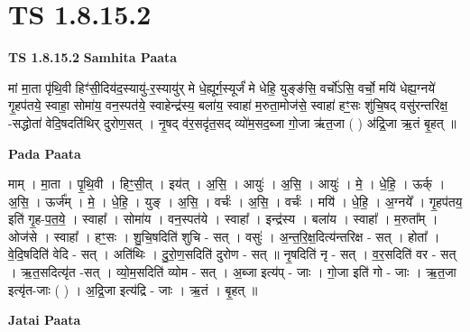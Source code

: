 \documentclass[17pt]{extarticle}
\begin{document}
\section{ TS 1.8.15.2 }

\textbf{TS 1.8.15.2 } \newline
\textbf{Samhita Paata} \newline

मां मा॒ता पृ॑थि॒वी हिꣳ॑सी॒दिय॑द॒स्यायु॑-र॒स्यायु॑र् मे धे॒ह्यूर्ग॒स्यूर्जं॑ मे धेहि॒ युङ्ङ॑सि॒ वर्चो॑ऽसि॒ वर्चो॒ मयि॑ धेह्य॒ग्नये॑ गृ॒हप॑तये॒ स्वाहा॒ सोमा॑य॒ वन॒स्पत॑ये॒ स्वाहेन्द्र॑स्य॒ बला॑य॒ स्वाहा॑ म॒रुता॒मोज॑से॒ स्वाहा॑ हꣳ॒॒सः शु॑चि॒षद् वसु॑रन्तरिक्ष॒ -सद्धोता॑ वेदि॒षदति॑थिर् दुरोण॒सत् । नृ॒षद् व॑र॒सदृ॑त॒सद् व्यो॑म॒सद॒ब्जा गो॒जा ऋ॑त॒जा ( ) अ॑द्रि॒जा ऋ॒तं बृ॒हत् ॥ \newline

\textbf{Pada Paata} \newline

माम् । मा॒ता । पृ॒थि॒वी । हिꣳ॒॒सी॒त् । इय॑त् । अ॒सि॒ । आयुः॑ । अ॒सि॒ । आयुः॑ । मे॒ । धे॒हि॒ । ऊर्क् । अ॒सि॒ । ऊर्ज᳚म् । मे॒ । धे॒हि॒ । युङ् । अ॒सि॒ । वर्चः॑ । अ॒सि॒ । वर्चः॑ । मयि॑ । धे॒हि॒ । अ॒ग्नये᳚ । गृ॒हप॑तय॒ इति॑ गृ॒ह-प॒त॒ये॒ । स्वाहा᳚ । सोमा॑य । वन॒स्पत॑ये । स्वाहा᳚ । इन्द्र॑स्य । बला॑य । स्वाहा᳚ । म॒रुता᳚म् । ओज॑से । स्वाहा᳚ । हꣳ॒॒सः । शु॒चि॒षदिति॑ शुचि - सत् । वसुः॑ । अ॒न्त॒रि॒क्ष॒दित्य॑न्तरिक्ष - सत् । होता᳚ । वे॒दि॒षदिति॑ वेदि - सत् । अति॑थिः । दु॒रो॒ण॒सदिति॑ दुरोण - सत् ॥ नृ॒षदिति॑ नृ - सत् । व॒र॒सदिति॑ वर - सत् । ऋ॒त॒सदित्यृ॑त -सत् । व्यो॒म॒सदिति॑ व्योम - सत् । अ॒ब्जा इत्य॑प् - जाः । गो॒जा इति॑ गो - जाः । ऋ॒त॒जा इत्यृ॑त-जाः ( ) । अ॒द्रि॒जा इत्य॑द्रि - जाः । ऋ॒तं । बृ॒हत् ॥  \newline



\textbf{Jatai Paata} \newline
\end{document}
